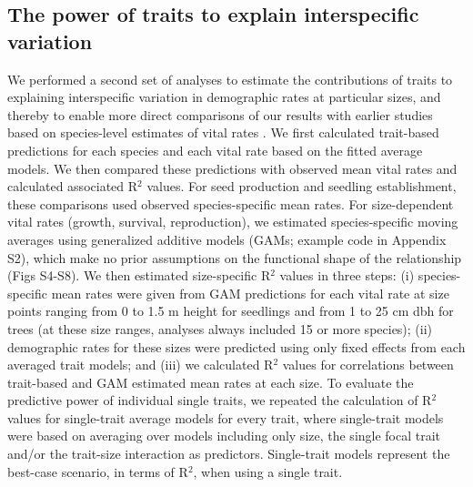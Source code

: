 \documentclass[b5paper,justified]{tufte-book} %
\begin{document}
\begin{fullwidth}
\subsection{The power of traits to explain interspecific variation} 
We performed a second set of analyses to estimate the contributions of traits to explaining interspecific variation in demographic rates at particular sizes, and thereby to enable more direct comparisons of our results with earlier studies based on species-level estimates of vital rates \citep{Poorter2008, Wright2010, Iida2012}. We first calculated trait-based predictions for each species and each vital rate based on the fitted average models. We then compared these predictions with observed mean vital rates and calculated associated R$^2$ values. For seed production and seedling establishment, these comparisons used observed species-specific mean rates. For size-dependent vital rates (growth, survival, reproduction), we estimated species-specific moving averages using generalized additive models (GAMs; example code in Appendix S2), which make no prior assumptions on the functional shape of the relationship (Figs S4-S8). We then estimated size-specific R$^2$ values in three steps: (i) species-specific mean rates were given from GAM predictions for each vital rate at size points ranging from 0 to 1.5 m height for seedlings and from 1 to 25 cm dbh for trees (at these size ranges, analyses always included 15 or more species); (ii) demographic rates for these sizes were predicted using only fixed effects from each averaged trait models; and (iii) we calculated R$^2$ values for correlations between trait-based and GAM estimated mean rates at each size. To evaluate the predictive power of individual single traits, we repeated the calculation of R$^2$ values for single-trait average models for every trait, where single-trait models were based on averaging over models including only size, the single focal trait and/or the trait-size interaction as predictors. Single-trait models represent the best-case scenario, in terms of R$^2$, when using a single trait.


\end{fullwidth}
\end{document}
